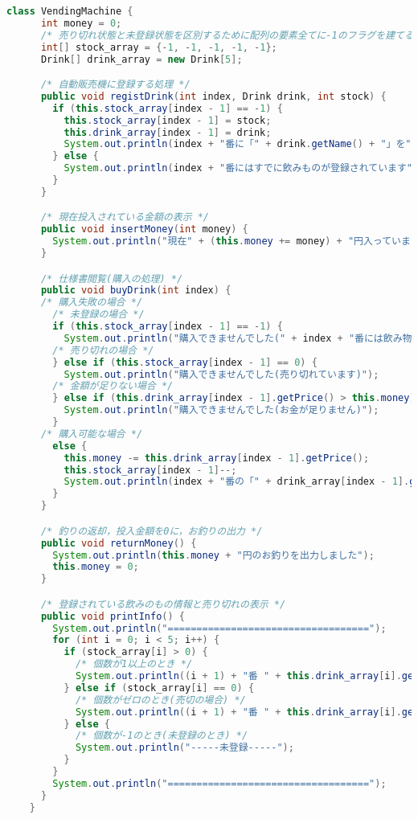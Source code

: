 \documentclass{jlreq}
\begin{document}
  \begin{lstlisting}[caption=VendingMachine.java, label=code:in, language=Java]
    class VendingMachine {
      int money = 0;
      /* 売り切れ状態と未登録状態を区別するために配列の要素全てに-1のフラグを建てる */
      int[] stock_array = {-1, -1, -1, -1, -1};
      Drink[] drink_array = new Drink[5];

      /* 自動販売機に登録する処理 */
      public void registDrink(int index, Drink drink, int stock) {
        if (this.stock_array[index - 1] == -1) {
          this.stock_array[index - 1] = stock;
          this.drink_array[index - 1] = drink;
          System.out.println(index + "番に「" + drink.getName() + "」を" + this.stock_array[index - 1] + "個登録しました");
        } else {
          System.out.println(index + "番にはすでに飲みものが登録されています");
        }
      }

      /* 現在投入されている金額の表示 */
      public void insertMoney(int money) {
        System.out.println("現在" + (this.money += money) + "円入っています");
      }

      /* 仕様書閲覧(購入の処理) */
      public void buyDrink(int index) {
      /* 購入失敗の場合 */
        /* 未登録の場合 */
        if (this.stock_array[index - 1] == -1) {
          System.out.println("購入できませんでした(" + index + "番には飲み物が登録されていません)");
        /* 売り切れの場合 */
        } else if (this.stock_array[index - 1] == 0) {
          System.out.println("購入できませんでした(売り切れています)");
        /* 金額が足りない場合 */
        } else if (this.drink_array[index - 1].getPrice() > this.money) {
          System.out.println("購入できませんでした(お金が足りません)");
        }
      /* 購入可能な場合 */
        else {
          this.money -= this.drink_array[index - 1].getPrice();
          this.stock_array[index - 1]--;
          System.out.println(index + "番の「" + drink_array[index - 1].getName() +"」を購入しました");
        }
      }

      /* 釣りの返却，投入金額を0に，お釣りの出力 */
      public void returnMoney() {
        System.out.println(this.money + "円のお釣りを出力しました");
        this.money = 0;
      }

      /* 登録されている飲みのもの情報と売り切れの表示 */
      public void printInfo() {
        System.out.println("===================================");
        for (int i = 0; i < 5; i++) {
          if (stock_array[i] > 0) {
            /* 個数が1以上のとき */
            System.out.println((i + 1) + "番 " + this.drink_array[i].getName() + " " + this.drink_array[i].getPrice() + "円 " + this.stock_array[i] + "個");
          } else if (stock_array[i] == 0) {
            /* 個数がゼロのとき(売切の場合) */
            System.out.println((i + 1) + "番 " + this.drink_array[i].getName() + " " + this.drink_array[i].getPrice() + "円 " + "売切");
          } else {
            /* 個数が-1のとき(未登録のとき) */
            System.out.println("-----未登録-----");
          }
        }
        System.out.println("===================================");
      }
    }
  \end{lstlisting}
\end{document}
